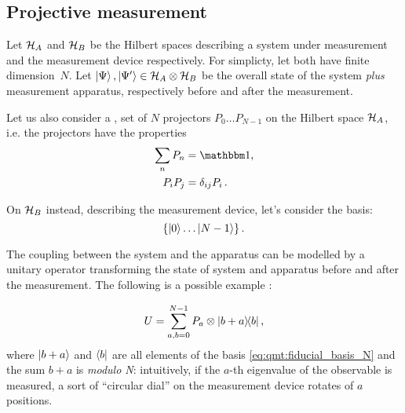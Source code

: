 \subsection{Projective measurement}

Let $\mathcal{H}_A$ and $\mathcal{H}_B$ be the Hilbert spaces describing
a system under measurement and the measurement device respectively.
For simplicty, let both have finite di\-mension~$N$.
Let $\ket{\Psi}, \ket{\Psi'} \in \mathcal{H}_{A} \otimes \mathcal{H}_{B}$
be the overall state of the
system \emph{plus} measurement apparatus, 
respectively before and after the measurement.

Let us also consider a ,  set of $N$ projectors
$P_0 \dots P_{N-1}$ on the Hilbert space $\mathcal{H}_A$,
i.e. the projectors have the properties
\begin{align}
  \sum_n P_n  &= \idop \text{,}\\
  P_i P_j     &= \delta_{ij}P_i \, \text{.}
\end{align}

On $\mathcal{H}_B$ instead, describing the measurement device, let's consider
the
basis:
\begin{equation}\label{eq:qmt:fiducial_basis_N}
  \left\{\ket{0} \dots \ket{N-1}\right\} \text{.}
\end{equation}

The coupling between the system and the apparatus
can be modelled by
a unitary operator
transforming the state of system and apparatus before and after the measurement.
The following is a possible
example \parencite[sec. 3.1.1 ``Orthogonal Measurements'']{PreskillNotes}:

\begin{equation}\label{eq:unitary_measurement}
  U = \sum_{a, b = 0}^{N-1} P_a \otimes \ketbra{b+a}{b} \text{,}
\end{equation}
where 
$\ket{b+a}$ and $\bra{b}$ are all elements of the basis \eqref{eq:qmt:fiducial_basis_N}
and
the sum $b+a$ is \emph{modulo N}:
intuitively, if the $a$-th eigenvalue of the observable is measured,
a sort of ``circular dial''
on the measurement device rotates of $a$ positions.

